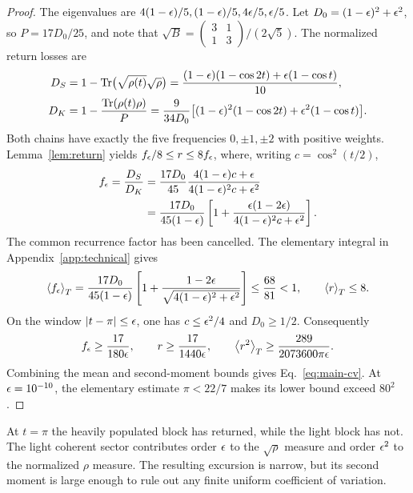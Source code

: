 \begin{proof}
The eigenvalues are $4(1-\epsilon)/5,(1-\epsilon)/5,4\epsilon/5,\epsilon/5$.
Let $D_0=(1-\epsilon)^2+\epsilon^2$, so $P=17D_0/25$, and note that
$\sqrt B=\left(\begin{smallmatrix}3&1\\1&3\end{smallmatrix}\right)/(2\sqrt5)$.
The normalized return losses are
\begin{equation}\label{eq:main-losses}
 \begin{aligned}
 D_S&=1-\operatorname{Tr}\bigl(\sqrt{\rho(t)}\sqrt\rho\bigr)
 =\frac{(1-\epsilon)(1-\cos2t)+\epsilon(1-\cos t)}{10},\\
 D_K&=1-\frac{\operatorname{Tr}(\rho(t)\rho)}P
 =\frac9{34D_0}\bigl[(1-\epsilon)^2(1-\cos2t)+\epsilon^2(1-\cos t)\bigr].
 \end{aligned}
\end{equation}
Both chains have exactly the five frequencies $0,\pm1,\pm2$ with positive
weights. Lemma~\ref{lem:return} yields $f_\epsilon/8\le r\le8f_\epsilon$,
where, writing $c=\cos^2(t/2)$,
\begin{equation}\label{eq:main-f}
 \begin{aligned}
 f_\epsilon=\frac{D_S}{D_K}
 &=\frac{17D_0}{45}
 \frac{4(1-\epsilon)c+\epsilon}{4(1-\epsilon)^2c+\epsilon^2}\\
 &=\frac{17D_0}{45(1-\epsilon)}
 \left[1+\frac{\epsilon(1-2\epsilon)}{4(1-\epsilon)^2c+\epsilon^2}\right].
 \end{aligned}
\end{equation}
The common recurrence factor has been cancelled. The elementary integral
in Appendix~\ref{app:technical} gives
\begin{equation}\label{eq:main-mean}
 \left\langle f_\epsilon\right\rangle_T=\frac{17D_0}{45(1-\epsilon)}
 \left[1+\frac{1-2\epsilon}{\sqrt{4(1-\epsilon)^2+\epsilon^2}}\right]
 \le\frac{68}{81}<1,\qquad \left\langle r\right\rangle_T\le8.
\end{equation}
On the window $|t-\pi|\le\epsilon$, one has $c\le\epsilon^2/4$ and
$D_0\ge1/2$. Consequently
\begin{equation}\label{eq:main-window}
 f_\epsilon\ge\frac{17}{180\epsilon},\qquad
 r\ge\frac{17}{1440\epsilon},\qquad
 \left\langle r^2\right\rangle_T\ge\frac{289}{2073600\pi\epsilon}.
\end{equation}
Combining the mean and second-moment bounds gives
Eq.~\eqref{eq:main-cv}. At $\epsilon=10^{-10}$, the elementary estimate
$\pi<22/7$ makes its lower bound exceed $80^2$.
\end{proof}

At $t=\pi$ the heavily populated block has returned, while the light block
has not. The light coherent sector contributes order $\epsilon$ to the
$\sqrt\rho$ measure and order $\epsilon^2$ to the normalized $\rho$ measure.
The resulting excursion is narrow, but its second moment is large enough
to rule out any finite uniform coefficient of variation.

